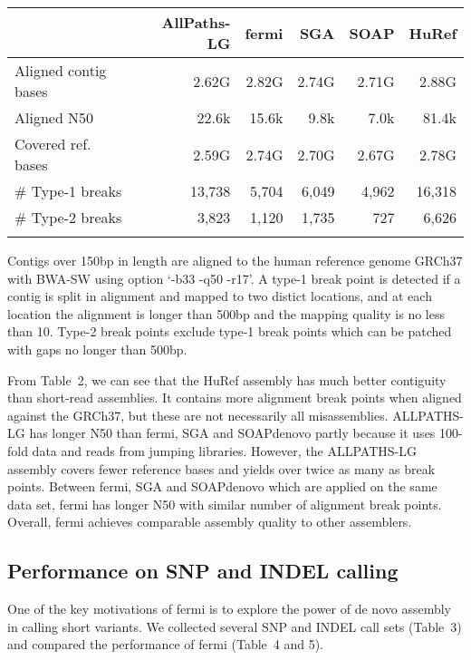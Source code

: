 \documentclass{bioinfo}
\begin{document}
\begin{table}[bt]
{\begin{tabular}{lrrrrr}
\toprule
& AllPaths-LG & fermi & SGA & SOAP & HuRef \\
\midrule
Aligned contig bases & 2.62G & 2.82G & 2.74G & 2.71G & 2.88G \\
Aligned N50          & 22.6k & 15.6k & 9.8k  & 7.0k  & 81.4k \\
Covered ref. bases   & 2.59G & 2.74G & 2.70G & 2.67G & 2.78G \\
\# Type-1 breaks & 13,738 & 5,704 & 6,049 & 4,962 & 16,318 \\
\# Type-2 breaks & 3,823 & 1,120 & 1,735 & 727 & 6,626 \\
\botrule
\end{tabular}}{Contigs over 150bp in length are aligned to the human reference
genome GRCh37 with BWA-SW using option `-b33 -q50 -r17'. A type-1 break point
is detected if a contig is split in alignment and mapped to two distict locations, and at
each location the alignment is longer than 500bp and the mapping quality is no
less than 10. Type-2 break points exclude type-1 break points which can be patched
with gaps no longer than 500bp.} \end{table}

From Table~2, we can see that the HuRef assembly has much better
contiguity than short-read assemblies. It contains more
alignment break points when aligned against the GRCh37, but these are not
necessarily all misassemblies. ALLPATHS-LG has longer N50 than fermi, SGA and
SOAPdenovo partly because it uses 100-fold data and reads from jumping
libraries. However, the ALLPATHS-LG assembly covers fewer reference bases and
yields over twice as many as break points. Between fermi, SGA and SOAPdenovo
which are applied on the same data set, fermi has longer N50 with similar
number of alignment break points.  Overall, fermi achieves comparable assembly
quality to other assemblers.

\subsection{Performance on SNP and INDEL calling}

One of the key motivations of fermi is to explore the power of de novo assembly
in calling short variants. We collected several SNP and INDEL call sets (Table~3)
and compared the performance of fermi (Table~4 and 5).
\end{document}
